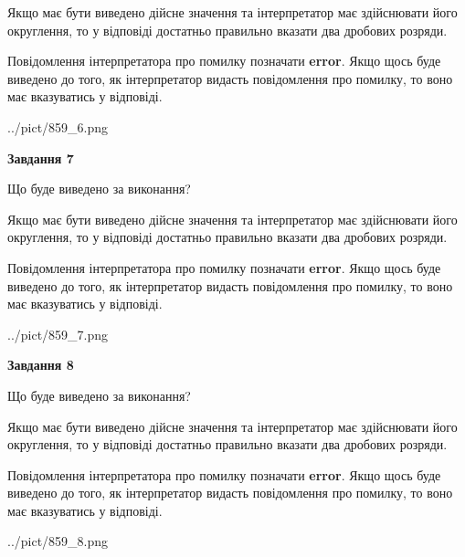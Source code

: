 \documentclass[12pt, ukrainian]{article}
\begin{document}
{\begin {Large}
Якщо має бути виведено дійсне значення та інтерпретатор має здійснювати його округлення, 
то у відповіді достатньо правильно вказати два дробових розряди.

Повідомлення інтерпретатора про помилку позначати \textbf{error}.
Якщо щось буде виведено до того, як інтерпретатор видасть повідомлення про помилку, 
то воно має вказуватись у відповіді. \par

\begin{center}
	{../pict/859_6.png}
\end{center}
\newpage

{\begin {center}\textbf{Завдання 7}\end {center}}\par
Що буде виведено за виконання? \par

Якщо має бути виведено дійсне значення та інтерпретатор має здійснювати його округлення, 
то у відповіді достатньо правильно вказати два дробових розряди.

Повідомлення інтерпретатора про помилку позначати \textbf{error}.
Якщо щось буде виведено до того, як інтерпретатор видасть повідомлення про помилку, 
то воно має вказуватись у відповіді. \par

\begin{center}
	{../pict/859_7.png}
\end{center}
\newpage

{\begin {center}\textbf{Завдання 8}\end {center}}\par
Що буде виведено за виконання? \par

Якщо має бути виведено дійсне значення та інтерпретатор має здійснювати його округлення, 
то у відповіді достатньо правильно вказати два дробових розряди.

Повідомлення інтерпретатора про помилку позначати \textbf{error}.
Якщо щось буде виведено до того, як інтерпретатор видасть повідомлення про помилку, 
то воно має вказуватись у відповіді. \par

\begin{center}
	{../pict/859_8.png}
\end{center}
\newpage


\end{Large}}
\end{document}

